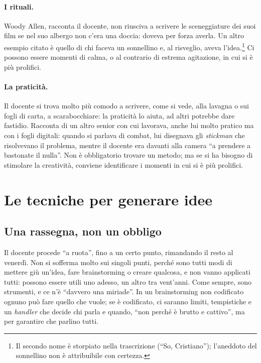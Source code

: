 \paragraph{I rituali.} Woody Allen, racconta il docente, non riusciva a
scrivere le sceneggiature dei suoi film se nel suo albergo non c'era una
doccia: doveva per forza averla. Un altro esempio citato è quello di chi
faceva un sonnellino e, al risveglio, aveva l'idea.\footnote{Il secondo nome è
storpiato nella trascrizione (``So, Cristiano''); l'aneddoto del sonnellino
non è attribuibile con certezza.} Ci possono essere momenti di calma, o al
contrario di estrema agitazione, in cui si è più prolifici.

\paragraph{La praticità.} Il docente si trova molto più comodo a scrivere,
come si vede, alla lavagna o sui fogli di carta, a scarabocchiare: la
praticità lo aiuta, ad altri potrebbe dare fastidio. Racconta di un altro
senior con cui lavorava, anche lui molto pratico ma con i fogli digitali:
quando si parlava di combat, lui disegnava gli \emph{stickman} che
risolvevano il problema, mentre il docente era davanti alla camera ``a
prendere a bastonate il nulla''. Non è obbligatorio trovare un metodo; ma se
si ha bisogno di stimolare la creatività, conviene identificare i momenti in
cui si è più prolifici.

\section{Le tecniche per generare idee}
\label{sec:tecniche-idee}

\subsection{Una rassegna, non un obbligo}

Il docente procede ``a ruota'', fino a un certo punto, rimandando il resto al
venerdì. Non si sofferma molto sui singoli punti, perché sono tutti modi di
mettere giù un'idea, fare brainstorming o creare qualcosa, e non vanno
applicati tutti: possono essere utili uno adesso, un altro tra vent'anni.
Come sempre, sono strumenti, e ce n'è ``davvero una miriade''. In un
brainstorming non codificato ognuno può fare quello che vuole; se è
codificato, ci saranno limiti, tempistiche e un \emph{handler} che decide chi
parla e quando, ``non perché è brutto e cattivo'', ma per garantire che
parlino tutti.

